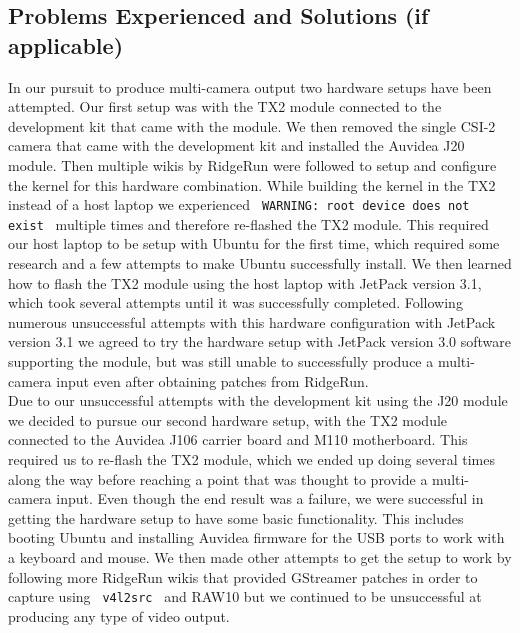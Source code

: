 \documentclass[letterpaper,10pt,serif,draftclsnofoot,onecolumn,compsoc,titlepage]{IEEEtran}
\begin{document}
\subsection{Problems Experienced and Solutions (if applicable)}

In our pursuit to produce multi-camera output two hardware setups have been attempted. 
Our first 
setup was with the TX2 module connected to the development kit that came with the module. 
We then removed the single CSI-2 camera that came with the development kit and installed 
the Auvidea J20 module. Then multiple wikis by RidgeRun were followed to setup 
and configure 
the kernel for this hardware combination. While building the kernel in the TX2 instead of 
a host laptop we experienced \texttt{ WARNING: root device  does not exist } multiple times
and therefore re-flashed the TX2 module. This required our host laptop to be setup with 
Ubuntu for the first time, which required some research and a few attempts to make Ubuntu 
successfully install. We then learned how to flash the TX2 module using the host laptop 
with JetPack version 3.1, which took several attempts until it was successfully completed. 
Following numerous unsuccessful attempts with this hardware configuration with JetPack 
version 3.1 we agreed to try the hardware setup with JetPack version 3.0 software 
supporting the module, but was still unable to successfully produce a multi-camera input 
even after obtaining patches from RidgeRun. \\

Due to our unsuccessful attempts with the development kit using the J20 module we decided 
to pursue our second hardware setup, with the TX2 module 
connected to the Auvidea J106 carrier board and M110 motherboard. This required us to 
re-flash the TX2 module, which we ended up doing several times along the way before 
reaching 
a point that was thought to provide a multi-camera input. Even though the end result was 
a
failure, we were successful in getting the hardware setup to have some basic 
functionality. This includes booting Ubuntu and installing Auvidea firmware for the USB 
ports to work with a keyboard and mouse. We then made other attempts to get the setup to
work by following more RidgeRun wikis that provided GStreamer patches in order to capture 
using \texttt{ v4l2src } and RAW10 but we continued to be unsuccessful at producing any type 
of video output. \\
\end{document}
